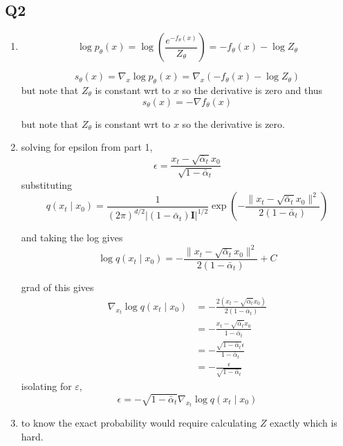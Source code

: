 \documentclass{report}
\begin{document}
\subsection*{Q2}

\begin{enumerate}
    \item \begin{equation}
        \log p_\theta(x) = \log \left( \frac{e^{-f_\theta(x)}}{Z_\theta} \right) = -f_\theta(x) - \log Z_\theta
    \end{equation}

    \begin{equation}
        s_\theta(x) = \nabla_x \log p_\theta(x) = \nabla_x \left( -f_\theta(x) - \log Z_\theta \right)
    \end{equation}
    but note that \(Z_\theta\) is constant wrt to \(x\) so the derivative is zero and thus
    \begin{equation}
        s_\theta(x) = -\nabla f_\theta(x)
    \end{equation}

    but note that \(Z_\theta\) is constant wrt to \(x\) so the derivative is zero.
    \item solving for epsilon from part 1,
    \begin{equation}
        \epsilon = \frac{x_t - \sqrt{\bar{\alpha}_t}x_0}{\sqrt{1 - \bar{\alpha}_t}}
    \end{equation}
    substituting
    \begin{equation}
        q(x_t \mid x_0) = \frac{1}{(2\pi)^{d/2} |(1 - \bar{\alpha}_t)\mathbf{I}|^{1/2}} \exp\left( -\frac{\|x_t - \sqrt{\bar{\alpha}_t}x_0\|^2}{2(1 - \bar{\alpha}_t)} \right)
    \end{equation}


    and taking the log gives
    \begin{equation}
        \log q(x_t \mid x_0) = -\frac{\|x_t - \sqrt{\bar{\alpha}_t}x_0\|^2}{2(1 - \bar{\alpha}_t)} + C
    \end{equation}

    grad of this gives 
    \begin{equation}
        \begin{split}
            \nabla_{x_t} \log q(x_t \mid x_0) &= -\frac{2(x_t - \sqrt{\bar{\alpha}_t}x_0)}{2(1 - \bar{\alpha}_t)}\\
            &= -\frac{x_t - \sqrt{\bar{\alpha}_t}x_0}{1 - \bar{\alpha}_t}\\
            &= -\frac{\sqrt{1 - \bar{\alpha}_t}\epsilon}{1 - \bar{\alpha}_t} \\ 
            & = -\frac{\epsilon}{\sqrt{1 - \bar{\alpha}_t}}
        \end{split}
    \end{equation}
    isolating for \(\varepsilon\),
    \begin{equation}
        \epsilon = -\sqrt{1 - \bar{\alpha}_t} \nabla_{x_t} \log q(x_t \mid x_0)
    \end{equation}
    \item to know the exact probability would require calculating \(Z\) exactly which is hard. 
\end{enumerate}
\end{document}
